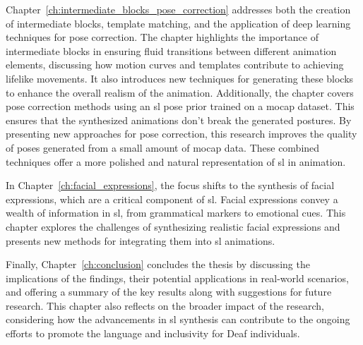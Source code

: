 \documentclass[../../main.tex]{subfiles}
\begin{document}
Chapter~\ref{ch:intermediate_blocks_pose_correction} addresses both the creation of intermediate blocks, template matching, and the application of deep learning techniques for pose correction. The chapter highlights the importance of intermediate blocks in ensuring fluid transitions between different animation elements, discussing how motion curves and templates contribute to achieving lifelike movements. It also introduces new techniques for generating these blocks to enhance the overall realism of the animation. Additionally, the chapter covers pose correction methods using an \gls{sl} pose prior trained on a \gls{mocap} dataset. This ensures that the synthesized animations don't break the generated postures. By presenting new approaches for pose correction, this research improves the quality of poses generated from a small amount of \gls{mocap} data. These combined techniques offer a more polished and natural representation of \gls{sl} in animation.

In Chapter~\ref{ch:facial_expressions}, the focus shifts to the synthesis of facial expressions, which are a critical component of \gls{sl}. Facial expressions convey a wealth of information in \gls{sl}, from grammatical markers to emotional cues. This chapter explores the challenges of synthesizing realistic facial expressions and presents new methods for integrating them into \gls{sl} animations.

Finally, Chapter~\ref{ch:conclusion} concludes the thesis by discussing the implications of the findings, their potential applications in real-world scenarios, and offering a summary of the key results along with suggestions for future research. This chapter also reflects on the broader impact of the research, considering how the advancements in \gls{sl} synthesis can contribute to the ongoing efforts to promote the language and inclusivity for Deaf individuals.
\end{document}
